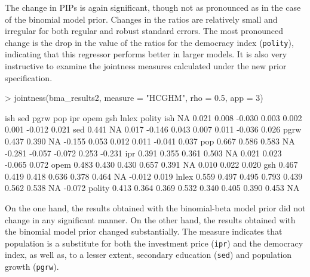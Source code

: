 \documentclass[a4paper]{article}
\begin{document}
The change in PIPs is again significant, though not as pronounced as in the case of the binomial model prior. Changes in the ratios are relatively small and irregular for both regular and robust standard errors. The most pronounced change is the drop in the value of the ratios for the democracy index (\verb+polity+), indicating that this regressor performs better in larger models. It is also very instructive to examine the jointness measures calculated under the new prior specification.
\begin{Schunk}
\begin{Sinput}
> jointness(bma_results2, measure = "HCGHM", rho = 0.5, app = 3)
\end{Sinput}
\begin{Soutput}
         ish   sed  pgrw    pop    ipr   opem    gsh  lnlex polity
ish       NA 0.021 0.008 -0.030  0.003  0.002  0.001 -0.012  0.021
sed    0.441    NA 0.017 -0.146  0.043  0.007  0.011 -0.036  0.026
pgrw   0.437 0.390    NA -0.155  0.053  0.012  0.011 -0.041  0.037
pop    0.667 0.586 0.583     NA -0.281 -0.057 -0.072  0.253 -0.231
ipr    0.391 0.355 0.361  0.503     NA  0.021  0.023 -0.065  0.072
opem   0.483 0.430 0.430  0.657  0.391     NA  0.010  0.022  0.020
gsh    0.467 0.419 0.418  0.636  0.378  0.464     NA -0.012  0.019
lnlex  0.559 0.497 0.495  0.793  0.439  0.562  0.538     NA -0.072
polity 0.413 0.364 0.369  0.532  0.340  0.405  0.390  0.453     NA
\end{Soutput}
\end{Schunk}
On the one hand, the results obtained with the binomial-beta model prior did not change in any significant manner. On the other hand, the results obtained with the binomial model prior changed substantially. The measure indicates that population is a substitute for both the investment price (\verb+ipr+) and the democracy index, as well as, to a lesser extent, secondary education (\verb+sed+) and population growth (\verb+pgrw+).
\end{document}
